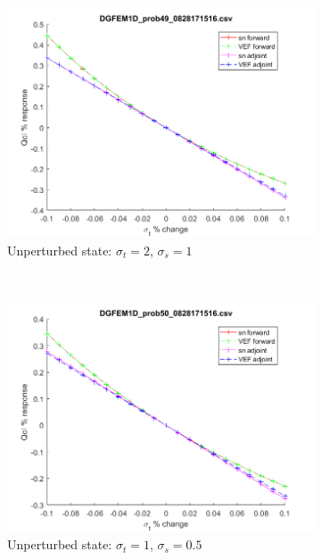 \documentclass{article}
\newcommand{\sigt}{\sigma_t}
\newcommand{\sigs}{\sigma_s}
\begin{document}
\begin{figure}[H]
\label{InHomoPertt}
\centering
\begin{subfigure}{.65\textwidth}
  \centering
  \includegraphics[width=.98\linewidth]{figures/49sigtSens.png}
  \caption{Unperturbed state: $\sigt=2$, $\sigs=1$}
  \label{fig:sfig1}
\end{subfigure}%
\\
\begin{subfigure}{.65\textwidth}
  \centering
  \includegraphics[width=.98\linewidth]{figures/50sigtSens.png}
  \caption{Unperturbed state: $\sigt=1$, $\sigs=0.5$}
  \label{fig:sfig2}
\end{subfigure}
\\
\begin{subfigure}{.65\textwidth}

\end{subfigure}
\end{figure}
\end{document}
